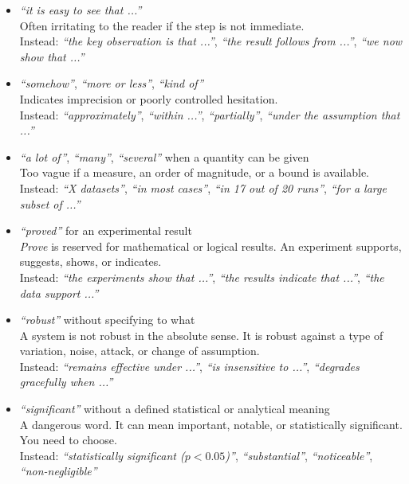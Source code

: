 \documentclass[11pt,a4paper]{article}
\theoremstyle{definition}
\begin{document}
\begin{itemize}
    \item \textit{``it is easy to see that ...''} \\
    Often irritating to the reader if the step is not immediate. \\
    Instead: \textit{``the key observation is that ...''}, \textit{``the result follows from ...''}, \textit{``we now show that ...''}

    \item \textit{``somehow''}, \textit{``more or less''}, \textit{``kind of''} \\
    Indicates imprecision or poorly controlled hesitation. \\
    Instead: \textit{``approximately''}, \textit{``within ...''}, \textit{``partially''}, \textit{``under the assumption that ...''}

    \item \textit{``a lot of''}, \textit{``many''}, \textit{``several''} when a quantity can be given \\
    Too vague if a measure, an order of magnitude, or a bound is available. \\
    Instead: \textit{``X datasets''}, \textit{``in most cases''}, \textit{``in 17 out of 20 runs''}, \textit{``for a large subset of ...''}

    \item \textit{``proved''} for an experimental result \\
    \textit{Prove} is reserved for mathematical or logical results. An experiment supports, suggests, shows, or indicates. \\
    Instead: \textit{``the experiments show that ...''}, \textit{``the results indicate that ...''}, \textit{``the data support ...''}

    \item \textit{``robust''} without specifying to what \\
    A system is not robust in the absolute sense. It is robust against a type of variation, noise, attack, or change of assumption. \\
    Instead: \textit{``remains effective under ...''}, \textit{``is insensitive to ...''}, \textit{``degrades gracefully when ...''}

    \item \textit{``significant''} without a defined statistical or analytical meaning \\
    A dangerous word. It can mean important, notable, or statistically significant. You need to choose. \\
    Instead: \textit{``statistically significant ($p<0.05$)''}, \textit{``substantial''}, \textit{``noticeable''}, \textit{``non-negligible''}


\end{itemize}
\end{document}
